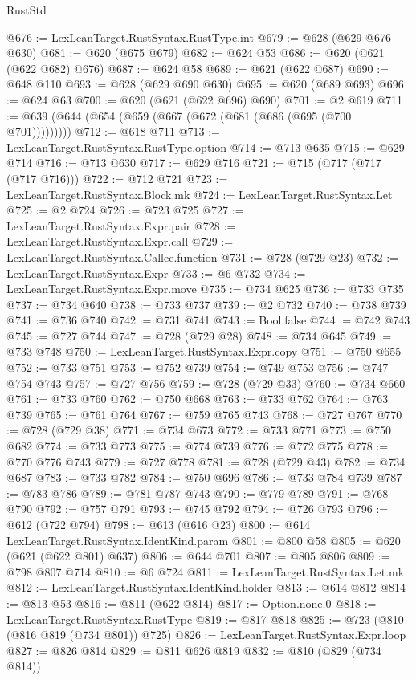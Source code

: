 \begin{lexlean}{RustStd}
\begin{coremodule}
@676 := LexLeanTarget.RustSyntax.RustType.int
@679 := @628 (@629 @676 @630)
@681 := @620 (@675 @679)
@682 := @624 @53
@686 := @620 (@621 (@622 @682) @676)
@687 := @624 @58
@689 := @621 (@622 @687)
@690 := @648 @110
@693 := @628 (@629 @690 @630)
@695 := @620 (@689 @693)
@696 := @624 @63
@700 := @620 (@621 (@622 @696) @690)
@701 := @2 @619
@711 := @639 (@644 (@654 (@659 (@667 (@672 (@681 (@686 (@695 (@700 @701)))))))))
@712 := @618 @711
@713 := LexLeanTarget.RustSyntax.RustType.option
@714 := @713 @635
@715 := @629 @714
@716 := @713 @630
@717 := @629 @716
@721 := @715 (@717 (@717 (@717 @716)))
@722 := @712 @721
@723 := LexLeanTarget.RustSyntax.Block.mk
@724 := LexLeanTarget.RustSyntax.Let
@725 := @2 @724
@726 := @723 @725
@727 := LexLeanTarget.RustSyntax.Expr.pair
@728 := LexLeanTarget.RustSyntax.Expr.call
@729 := LexLeanTarget.RustSyntax.Callee.function
@731 := @728 (@729 @23)
@732 := LexLeanTarget.RustSyntax.Expr
@733 := @6 @732
@734 := LexLeanTarget.RustSyntax.Expr.move
@735 := @734 @625
@736 := @733 @735
@737 := @734 @640
@738 := @733 @737
@739 := @2 @732
@740 := @738 @739
@741 := @736 @740
@742 := @731 @741
@743 := Bool.false
@744 := @742 @743
@745 := @727 @744
@747 := @728 (@729 @28)
@748 := @734 @645
@749 := @733 @748
@750 := LexLeanTarget.RustSyntax.Expr.copy
@751 := @750 @655
@752 := @733 @751
@753 := @752 @739
@754 := @749 @753
@756 := @747 @754 @743
@757 := @727 @756
@759 := @728 (@729 @33)
@760 := @734 @660
@761 := @733 @760
@762 := @750 @668
@763 := @733 @762
@764 := @763 @739
@765 := @761 @764
@767 := @759 @765 @743
@768 := @727 @767
@770 := @728 (@729 @38)
@771 := @734 @673
@772 := @733 @771
@773 := @750 @682
@774 := @733 @773
@775 := @774 @739
@776 := @772 @775
@778 := @770 @776 @743
@779 := @727 @778
@781 := @728 (@729 @43)
@782 := @734 @687
@783 := @733 @782
@784 := @750 @696
@786 := @733 @784 @739
@787 := @783 @786
@789 := @781 @787 @743
@790 := @779 @789
@791 := @768 @790
@792 := @757 @791
@793 := @745 @792
@794 := @726 @793
@796 := @612 (@722 @794)
@798 := @613 (@616 @23)
@800 := @614 LexLeanTarget.RustSyntax.IdentKind.param
@801 := @800 @58
@805 := @620 (@621 (@622 @801) @637)
@806 := @644 @701
@807 := @805 @806
@809 := @798 @807 @714
@810 := @6 @724
@811 := LexLeanTarget.RustSyntax.Let.mk
@812 := LexLeanTarget.RustSyntax.IdentKind.holder
@813 := @614 @812
@814 := @813 @53
@816 := @811 (@622 @814)
@817 := Option.none.{0}
@818 := LexLeanTarget.RustSyntax.RustType
@819 := @817 @818
@825 := @723 (@810 (@816 @819 (@734 @801)) @725)
@826 := LexLeanTarget.RustSyntax.Expr.loop
@827 := @826 @814
@829 := @811 @626 @819
@832 := @810 (@829 (@734 @814))

\end{coremodule}
\end{lexlean}

